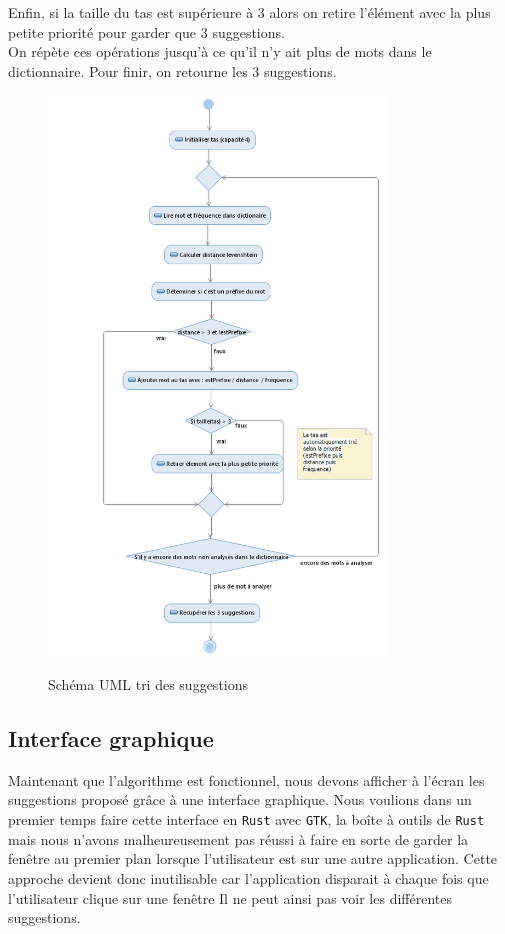 \documentclass[a4paper, 11pt]{report}
\newcommand{\langage}[1]{\texttt{#1}}
\begin{document}
{Enfin, si la taille du tas est supérieure à 3 alors on retire l'élément avec la plus petite priorité pour garder que 3 suggestions. \\
On répète ces opérations jusqu'à ce qu'il n'y ait plus de mots dans le dictionnaire. Pour finir, on retourne les 3 suggestions. \\

\begin{figure}[H]
	\begin{center}
		{\includegraphics[width=0.8\textwidth]{images/uml_algo.png}}
	\end{center}
	\caption{Schéma UML tri des suggestions}
	\label{fig:uml}
\end{figure}

\subsection{Interface graphique}

Maintenant que l'algorithme est fonctionnel, nous devons afficher à l'écran les suggestions proposé grâce à une interface graphique. Nous voulions dans un premier temps faire cette interface en \langage{Rust} avec \langage{GTK}, la boîte à outils de \langage{Rust}  mais nous n'avons malheureusement pas réussi à faire en sorte de garder la fenêtre au premier plan lorsque l'utilisateur est sur une autre application. Cette approche devient donc inutilisable car l'application disparait à chaque fois que l'utilisateur clique sur une fenêtre Il ne peut ainsi pas voir les différentes suggestions.\\

}
\end{document}
